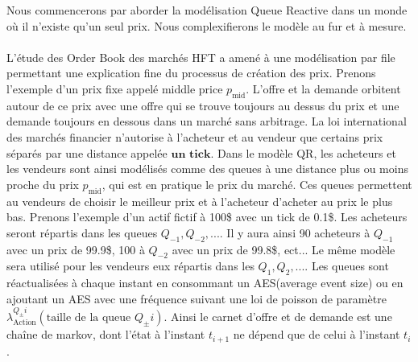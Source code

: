 \documentclass[12pt,a4paper]{article}
\theoremstyle{definition}
\theoremstyle{remark}
\begin{document}
Nous commencerons par aborder la modélisation Queue Reactive dans un monde où il n'existe qu'un seul prix. Nous complexifierons le modèle au fur et à mesure.
\\
\\
L'étude des Order Book des marchés HFT a amené à une modélisation par file permettant une explication fine du processus de création des prix. Prenons l'exemple d'un prix fixe appelé middle price $p_{\text{mid}}$. L'offre et la demande orbitent autour de ce prix avec une offre qui se trouve toujours au dessus du prix et une demande toujours en dessous dans un marché sans arbitrage. La loi international des marchés financier n'autorise à l'acheteur et au vendeur que certains prix séparés par une distance appelée $\textbf{un tick}$. Dans le modèle QR, les acheteurs et les vendeurs sont ainsi modélisés comme des queues à une distance plus ou moins proche du prix $p_{\text{mid}}$, qui est en pratique le prix du marché. Ces queues permettent au vendeurs de choisir le meilleur prix et à l'acheteur d'acheter au prix le plus bas. Prenons l'exemple d'un actif fictif à 100\$ avec un tick de 0.1\$. Les acheteurs seront répartis dans les queues $Q_{-1},Q_{-2},...$. Il y aura ainsi 90 acheteurs à $Q_{-1}$ avec un prix de 99.9\$, 100 à $Q_{-2}$ avec un prix de 99.8\$, ect... Le même modèle sera utilisé pour les vendeurs eux répartis dans les $Q_{1},Q_2,...$. Les queues sont réactualisées à chaque instant en consommant un AES(average event size) ou en ajoutant un AES avec une fréquence suivant une loi de poisson de paramètre $\lambda^{Q_\pm i}_{\text{Action}}(\text{taille de la queue } Q_\pm i)$. Ainsi le carnet d'offre et de demande est une chaîne de markov, dont l'état à l'instant $t_{i+1}$ ne dépend que de celui à l'instant $t_i$.
\end{document}
